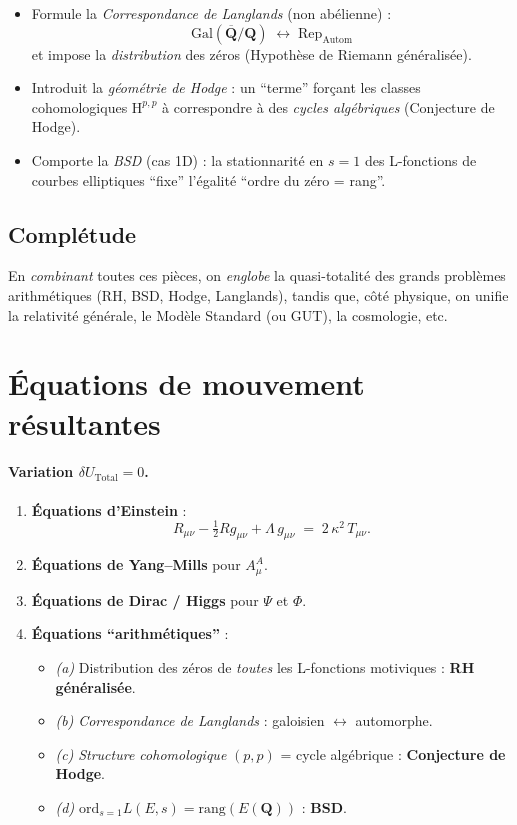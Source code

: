 \documentclass[11pt]{article}
\begin{document}
\begin{itemize}
  \item Formule la \emph{Correspondance de Langlands} (non abélienne) : 
    \[
      \mathrm{Gal}(\overline{\mathbf{Q}}/\mathbf{Q}) 
      \;\longleftrightarrow\; 
      \mathrm{Rep}_{\mathrm{Autom}}
    \]
    et impose la \emph{distribution} des zéros (Hypothèse de Riemann généralisée).
  \item Introduit la \emph{géométrie de Hodge} : un “terme” forçant les classes cohomologiques $\mathrm{H}^{p,p}$ à correspondre à des \emph{cycles algébriques} (Conjecture de Hodge).
  \item Comporte la \emph{BSD} (cas 1D) : la stationnarité en $s=1$ des L-fonctions de courbes elliptiques “fixe” l'égalité “ordre du zéro = rang”.
\end{itemize}

\subsection{Complétude}
En \emph{combinant} toutes ces pièces, on \emph{englobe} la quasi-totalité des grands problèmes arithmétiques (RH, BSD, Hodge, Langlands), tandis que, côté physique, on unifie la relativité générale, le Modèle Standard (ou GUT), la cosmologie, etc.

\section{Équations de mouvement résultantes}

\paragraph{Variation \(\delta U_{\mathrm{Total}}=0\).} 
\begin{enumerate}
  \item \textbf{Équations d'Einstein} : 
  \[
    R_{\mu\nu}-\tfrac12Rg_{\mu\nu}+\Lambda\,g_{\mu\nu} \;=\; 2\,\kappa^2\,T_{\mu\nu}.
  \]
  \item \textbf{Équations de Yang--Mills} pour $A_\mu^A$.
  \item \textbf{Équations de Dirac / Higgs} pour $\Psi$ et $\Phi$.
  \item \textbf{Équations “arithmétiques”} : 
    \begin{itemize}
      \item \emph{(a)} Distribution des zéros de \emph{toutes} les L-fonctions motiviques : \textbf{RH généralisée}.
      \item \emph{(b)} \emph{Correspondance de Langlands} : galoisien $\leftrightarrow$ automorphe.
      \item \emph{(c)} \emph{Structure cohomologique} \((p,p)\) = cycle algébrique : \textbf{Conjecture de Hodge}.
      \item \emph{(d)} \(\mathrm{ord}_{s=1}L(E,s)=\mathrm{rang}(E(\mathbf{Q}))\) : \textbf{BSD}.
    \end{itemize}
\end{enumerate}
\end{document}
